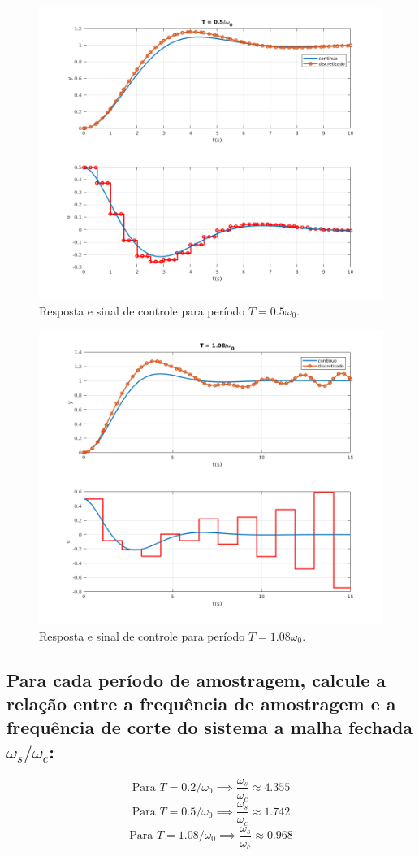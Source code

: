 \documentclass{article}
\begin{document}
    \begin{figure}[H]
        \centering
            \includegraphics[width=.7\linewidth]{images/periodo_05.png}
            \caption{Resposta e sinal de controle para período $T = 0.5\omega_0$.}\label{fig:periodo_05}
    \end{figure}

    \begin{figure}[H]
        \centering
            \includegraphics[width=.7\linewidth]{images/periodo_108.png}
            \caption{Resposta e sinal de controle para período $T = 1.08\omega_0$.}\label{fig:periodo_108}
    \end{figure}


\subsection{Para cada período de amostragem, calcule a relação entre a frequência de amostragem e a frequência de corte do sistema a malha fechada $\omega_s/\omega_c$:}
    \[ \textrm{Para } T = 0.2/\omega_0  \implies \frac{\omega_s}{\omega_c} \approx 4.355 \]
    \[ \textrm{Para } T = 0.5/\omega_0  \implies \frac{\omega_s}{\omega_c} \approx 1.742 \]
    \[ \textrm{Para } T = 1.08/\omega_0 \implies \frac{\omega_s}{\omega_c} \approx 0.968 \]
\end{document}

